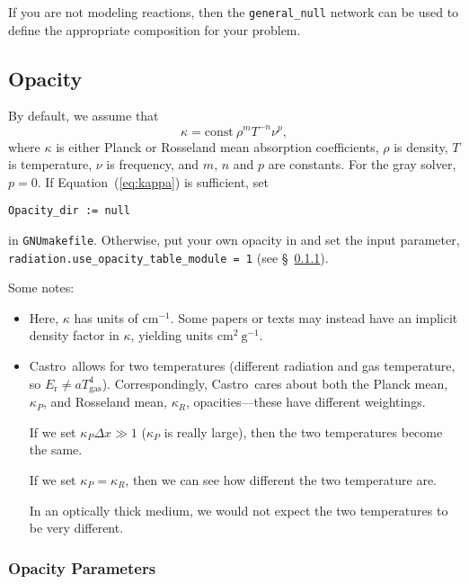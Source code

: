 \documentclass[11pt,letterpaper]{article}
\newcommand{\castro}{{\sf Castro}}
\begin{document}
If you are not modeling reactions, then the {\tt general\_null}
network can be used to define the appropriate composition for
your problem.

\subsection{Opacity}

By default, we assume that
\begin{equation}
  \kappa = \mathrm{const}\ \rho^{m} T^{-n} \nu^{p} , \label{eq:kappa}
\end{equation}
where $\kappa$ is either Planck or Rosseland mean absorption
coefficients, $\rho$ is density, $T$ is temperature, $\nu$ is
frequency, and $m$, $n$ and $p$ are constants.  For the gray solver,
$p = 0$.  If Equation~(\ref{eq:kappa}) is sufficient, set
\begin{verbatim}
Opacity_dir := null
\end{verbatim}
in {\tt GNUmakefile}.  Otherwise, put your own opacity in
{\tt{}} and set
the input parameter, {\tt radiation.use\_opacity\_table\_module = 1} (see
\S~\ref{sec:opacpars}).

Some notes:
\begin{itemize}
\item Here, $\kappa$ has units of $\mathrm{cm}^{-1}$.  Some papers or
  texts may instead have an implicit density factor in $\kappa$,
  yielding units $\mathrm{cm}^2~\mathrm{g}^{-1}$.

\item \castro\ allows for two temperatures (different radiation and gas
  temperature, so $E_\mathrm{r} \ne a T_\mathrm{gas}^4$).
  Correspondingly,  \castro\ cares about both the Planck mean,
  $\kappa_P$, and Rosseland mean, $\kappa_R$, opacities---these have
  different weightings.

  If we set $\kappa_P \Delta x \gg 1$ ($\kappa_P$ is really large),
  then the two temperatures become the same.

  If we set $\kappa_P = \kappa_R$, then we can see how different the
  two temperature are.

  In an optically thick medium, we would not expect the two temperatures
  to be very different.

\end{itemize}


\subsubsection{Opacity Parameters}
\label{sec:opacpars}
\end{document}
